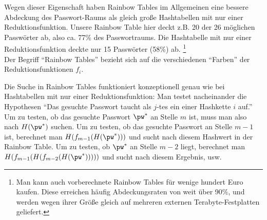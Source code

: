 Wegen dieser Eigenschaft haben Rainbow Tables im Allgemeinen eine bessere Abdeckung des Passwort-Raums als gleich große Hashtabellen mit nur einer Reduktionsfunktion. Unsere Rainbow Table hier deckt z.B. 20 der 26 möglichen Passwörter ab, also ca. 77\% des Passwortraums. Die Hashtabelle mit nur einer Reduktionsfunktion deckte nur 15 Passwörter (58\%) ab.%
\footnote{Man kann auch vorberechnete Rainbow Tables für wenige hundert Euro kaufen. Diese erreichen häufig Abdeckungsraten von weit über 90\%, und werden wegen ihrer Größe gleich auf mehreren externen Terabyte-Festplatten geliefert. %
}\\

Der Begriff "`Rainbow Tables"' bezieht sich auf die verschiedenen "`Farben"' der Reduktionsfunktionen $f_i$.

Die Suche in Rainbow Tables funktioniert konzeptionell genau wie bei Hashtabellen mit nur einer Reduktionsfunktion: Man testet nacheinander die Hypothesen "`Das gesuchte Passwort taucht als $j$-tes ein einer Hashkette $i$ auf."' Um zu testen, ob das gesuchte Passwort $\pw^*$ an Stelle $m$ ist, muss man also nach $H(\pw^*)$ suchen. Um zu testen, ob das gesuchte Passwort an Stelle $m-1$ ist, berechnet man $H(f_{m-1}(H(\pw^*)))$ und sucht nach diesem Hashwert in der Rainbow Table. Um zu testen, ob $\pw^*$ an Stelle $m-2$ liegt, berechnet man $H(f_{m-1}(H(f_{m-2}(H(\pw^*)))))$ und sucht nach diesem Ergebnis, usw.\\

